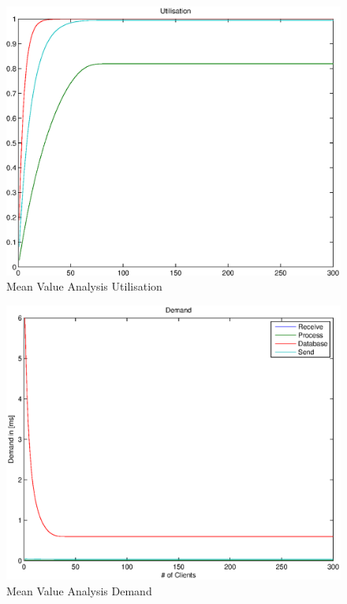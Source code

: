 \documentclass[a4paper]{article}
\begin{document}

\begin{figure}[H]
	\begin{center}
    \includegraphics[scale=0.6]{../plots-ms2-mg/mva-utilisation.eps}
  \end{center}
  \caption{Mean Value Analysis Utilisation}
  \label{fig:mva-utilisation}
\end{figure}




\begin{figure}[H]
	\begin{center}
    \includegraphics[scale=0.6]{../plots-ms2-mg/mva-demand.eps}
  \end{center}
  \caption{Mean Value Analysis Demand}
  \label{fig:mva-demand}
\end{figure}
\end{document}
